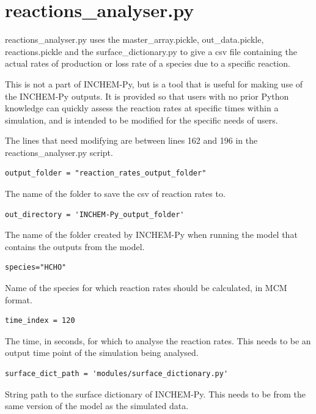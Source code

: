 \documentclass[a4paper]{refart}
\begin{document}
\clearpage
\section{reactions\_analyser.py}\label{reactions_analyser.py}
reactions\_analyser.py uses the master\_array.pickle, out\_data.pickle, reactions.pickle and the surface\_dictionary.py to give a csv file containing the actual rates of production or loss rate of a species due to a specific reaction.

This is not a part of INCHEM-Py, but is a tool that is useful for making use of the INCHEM-Py outputs. It is provided so that users with no prior Python knowledge can quickly assess the reaction rates at specific times within a simulation, and is intended to be modified for the specific needs of users.

The lines that need modifying are between lines 162 and 196 in the reactions\_analyser.py script.

\begin{verbatim}
output_folder = "reaction_rates_output_folder"
\end{verbatim}
The name of the folder to save the csv of reaction rates to.

\begin{verbatim}
out_directory = 'INCHEM-Py_output_folder'
\end{verbatim}
The name of the folder created by INCHEM-Py when running the model that contains the outputs from the model.

\begin{verbatim}
species="HCHO"
\end{verbatim}
Name of the species for which reaction rates should be calculated, in MCM format.

\begin{verbatim}
time_index = 120
\end{verbatim}
The time, in seconds, for which to analyse the reaction rates. This needs to be an output time point of the simulation being analysed.

\begin{verbatim}
surface_dict_path = 'modules/surface_dictionary.py'
\end{verbatim}
String path to the surface dictionary of INCHEM-Py. This needs to be from the same version of the model as the simulated data.
\end{document}
